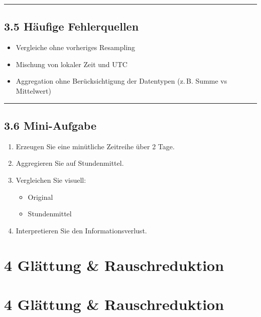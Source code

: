 \documentclass[
  ngerman,
  letterpaper,
  DIV=11]{scrreprt}
\providecommand{\tightlist}{%
  \setlength{\itemsep}{0pt}\setlength{\parskip}{0pt}}
\begin{document}
\begin{center}\rule{0.5\linewidth}{0.5pt}\end{center}

\section{3.5 Häufige Fehlerquellen}\label{huxe4ufige-fehlerquellen}

\begin{itemize}
\tightlist
\item
  Vergleiche ohne vorheriges Resampling
\item
  Mischung von lokaler Zeit und UTC
\item
  Aggregation ohne Berücksichtigung der Datentypen (z.\,B. Summe vs
  Mittelwert)
\end{itemize}

\begin{center}\rule{0.5\linewidth}{0.5pt}\end{center}

\section{3.6 Mini-Aufgabe}\label{mini-aufgabe-1}

\begin{enumerate}
\def\labelenumi{\arabic{enumi}.}
\tightlist
\item
  Erzeugen Sie eine minütliche Zeitreihe über 2 Tage.
\item
  Aggregieren Sie auf Stundenmittel.
\item
  Vergleichen Sie visuell:

  \begin{itemize}
  \tightlist
  \item
    Original
  \item
    Stundenmittel
  \end{itemize}
\item
  Interpretieren Sie den Informationsverlust.
\end{enumerate}


\chapter{4 Glättung \&
Rauschreduktion}\label{gluxe4ttung-rauschreduktion}


\chapter{4 Glättung \&
Rauschreduktion}\label{gluxe4ttung-rauschreduktion-1}
\end{document}
